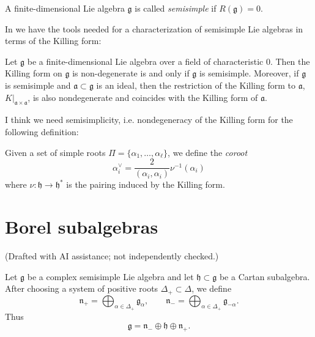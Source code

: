 \begin{definition}
\label{definition-semisimple-lie-algebra-duplicate-2}
A finite-dimensional Lie algebra
$\mathfrak{g}$ is called {\it semisimple} if
$R(\mathfrak{g})=0$.
\end{definition}

In \cite[Lecture 11]{KLAL} we have the tools
needed for a characterization
of semisimple Lie algebras in terms of the
Killing form:

\begin{theorem}[Cartan]
\label{theorem-Cartan}
Let $\mathfrak{g}$ be a finite-dimensional
Lie algebra
over a field of characteristic 0.
Then the Killing form on $\mathfrak{g}$ is
non-degenerate is and only if
$\mathfrak{g}$ is semisimple.
Moreover, if $\mathfrak{g}$ is semisimple and
$\mathfrak{a}\subset\mathfrak{g}$
is an ideal,
then the restriction of the Killing form to
$\mathfrak{a}$,
$K|_{\mathfrak{a}\times\mathfrak{a}}$,
is also nondegenerate and coincides with the
Killing form of $\mathfrak{a}$.
\end{theorem}

I think we need semisimplicity, i.e.
nondegeneracy of the
Killing form for the following definition:

\begin{definition}
\label{definition-coroot}
Given a set of simple roots
$\Pi=\{\alpha_1,\ldots,\alpha_\ell\}$,
we define the {\it coroot}
\begin{equation}
\label{equation-coroot}
\alpha_i^\vee=\frac{2}{(\alpha_i,\alpha_i)}
\nu^{-1}(\alpha_i)
\end{equation}
where $\nu:\mathfrak{h}\to\mathfrak{h}^*$ is
the pairing
induced by the Killing form.
\end{definition}

\section{Borel subalgebras}
\label{section-Borel-subalgebras}

\noindent
(Drafted with AI assistance; not independently checked.)

\medskip\noindent
Let $\mathfrak{g}$ be a complex semisimple
Lie algebra and let $\mathfrak{h}\subset
\mathfrak{g}$ be a Cartan subalgebra. After
choosing a system of positive roots
$\Delta_+\subset \Delta$, we define
$$
\mathfrak{n}_+
=
\bigoplus_{\alpha\in\Delta_+}\mathfrak{g}_\alpha,
\qquad
\mathfrak{n}_-
=
\bigoplus_{\alpha\in\Delta_+}\mathfrak{g}_{-\alpha}.
$$
Thus
$$
\mathfrak{g}
=
\mathfrak{n}_-
\oplus
\mathfrak{h}
\oplus
\mathfrak{n}_+.
$$

